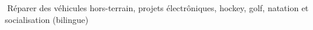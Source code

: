\documentclass[mm]{res}
\begin{document}
\begin{resume}



\toprule

\section{\headinginterests}
􏰚\tb R\'eparer des v\'ehicules hors-terrain, projets \'electr\^oniques, hockey, golf, natation et socialisation (bilingue)

\end{resume}
\end{document}
